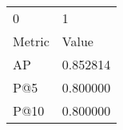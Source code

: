 \begin{tabular}{ll}
0 & 1 \\
Metric & Value \\
AP & 0.852814 \\
P@5 & 0.800000 \\
P@10 & 0.800000 \\
\end{tabular}
